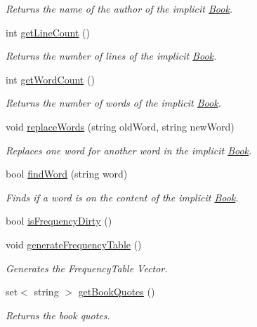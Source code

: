 \begin{DoxyCompactItemize}
\begin{DoxyCompactList}\small\item\em Returns the name of the author of the implicit \hyperlink{class_book}{Book}. \end{DoxyCompactList}\item 
int \hyperlink{class_book_a97ccb67ee2b4b0d553163d2301d9a00e}{get\+Line\+Count} ()
\begin{DoxyCompactList}\small\item\em Returns the number of lines of the implicit \hyperlink{class_book}{Book}. \end{DoxyCompactList}\item 
int \hyperlink{class_book_a29418f8797be1143747a449445f064a9}{get\+Word\+Count} ()
\begin{DoxyCompactList}\small\item\em Returns the number of words of the implicit \hyperlink{class_book}{Book}. \end{DoxyCompactList}\item 
void \hyperlink{class_book_aaf182e24b86624b6ff54fba2581094a4}{replace\+Words} (string old\+Word, string new\+Word)
\begin{DoxyCompactList}\small\item\em Replaces one word for another word in the implicit \hyperlink{class_book}{Book}. \end{DoxyCompactList}\item 
bool \hyperlink{class_book_af3ceb5ae5d66adf4d594cac8d29294fc}{find\+Word} (string word)
\begin{DoxyCompactList}\small\item\em Finds if a word is on the content of the implicit \hyperlink{class_book}{Book}. \end{DoxyCompactList}\item 
bool \hyperlink{class_book_aec01aa24087b313f36cc0fe3c4664f84}{is\+Frequency\+Dirty} ()
\item 
void \hyperlink{class_book_a8d232eaeb4207707d77bc18e6dd467cd}{generate\+Frequency\+Table} ()
\begin{DoxyCompactList}\small\item\em Generates the Frequency\+Table Vector. \end{DoxyCompactList}\item 
set$<$ string $>$ \hyperlink{class_book_a7e0d6cb0827bc58637da5ba49b4e1944}{get\+Book\+Quotes} ()
\begin{DoxyCompactList}\small\item\em Returns the book quotes. \end{DoxyCompactList}\item 

\end{DoxyCompactItemize}
